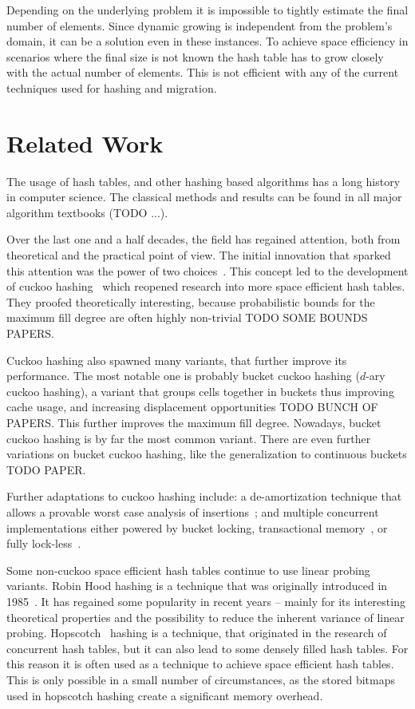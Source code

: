 \documentclass[a4paper,UKenglish]{lipics-v2016}
\begin{document}
Depending on the underlying problem it is impossible to tightly
estimate the final number of elements. Since dynamic growing is independent from the problem's domain, it can be a
solution even in these instances.  To achieve space efficiency in
scenarios where the final size is not known the hash table has to grow
closely with the actual number of elements.  This is not efficient
with any of the current techniques used for hashing and migration.

\section{Related Work}
The usage of hash tables, and other hashing based algorithms has a
long history in computer science.  The classical methods and results
can be found in all major algorithm textbooks (TODO ...).

Over the last one and a half decades, the field has regained
attention, both from theoretical and the practical point of view.  The
initial innovation that sparked this attention was the power of two
choices~\cite{ThePowerOfTwoChoicesInRandomizedLoadBalancing}.  This
concept led to the development of cuckoo hashing~\cite{CuckooHashing}
which reopened research into more space efficient hash tables.  They
proofed theoretically interesting, because probabilistic bounds for
the maximum fill degree are often highly non-trivial TODO SOME BOUNDS
PAPERS.

Cuckoo hashing also spawned many variants, that further improve its
performance.  The most notable one is probably bucket cuckoo hashing
($d$-ary cuckoo hashing), a variant that groups cells together in
buckets thus improving cache usage, and increasing displacement
opportunities TODO BUNCH OF PAPERS.  This further improves the maximum
fill degree. Nowadays, bucket cuckoo hashing is by far the most common
variant. There are even further variations on bucket cuckoo hashing,
like the generalization to continuous buckets TODO PAPER.

Further adaptations to cuckoo hashing include: a de-amortization
technique that allows a provable worst case analysis of
insertions~\cite{UsingAQueueToDeAmortizeCuckooHashingInHardware,
  DeAmortizedCuckooHashingProvableWorstCasePerformanceAndExperimentalResults};
and multiple concurrent implementations either powered by bucket
locking, transactional
memory~\cite{AlgorithmicImprovementsForFastConcurrentCuckooHashing},
or fully lock-less~\cite{LockFreeCuckooHashing}.

Some non-cuckoo space efficient hash tables continue to use linear
probing variants.  Robin Hood hashing is a technique that was
originally introduced in 1985~\cite{RobinHoodHashing}. It has regained some popularity in
recent years -- mainly for its interesting theoretical
properties and the possibility to reduce the inherent variance of
linear probing.  Hopscotch~\cite{HopscotchHashing} hashing is a
technique, that originated in the research of concurrent hash tables, but
it can also lead to some densely filled hash tables.  For this reason
it is often used as a technique to achieve space efficient hash
tables.  This is only possible in a small number of circumstances, as
the stored bitmaps used in hopscotch hashing create a significant
memory overhead.
\end{document}

